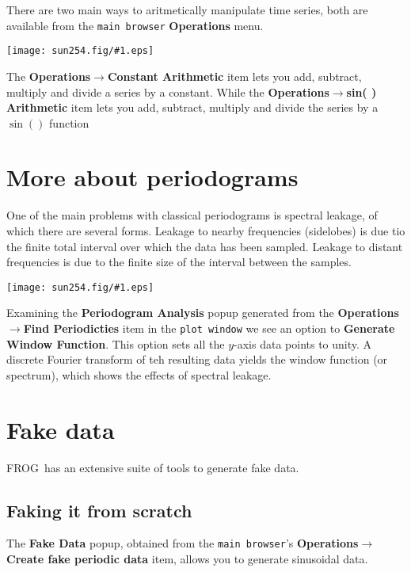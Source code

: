 \documentclass[twoside,11pt]{article}
\newcommand{\htmladdimg}[1]{}
\newcommand{\latexhtml}[2]{#1}
\newcommand{\xlabel}[1]{}
\renewcommand{\_}{\texttt{\symbol{95}}}
\newcommand{\FROG}{\textsf{FROG}}
\newcommand{\mainfigure}[1]
{\begin{center}
 \latexhtml{\texttt{[image: sun254.fig/\#1.eps]}}{\htmladdimg{../sun254.fig/#1.gif}}
 \end{center}
}
\newcommand{\menuitem}[1]{\textbf{#1}}
\newcommand{\submenuitem}[2]{\latexhtml{\textbf{#1$\rightarrow$#2}}{\textbf{#1=>#2}}}
\newcommand{\labelitem}[1]{\textbf{#1}}
\newcommand{\hitext}[1]{\texttt{#1}}
\begin{document}
There are two main ways to aritmetically manipulate time series, both are available from the \hitext{main browser} \menuitem{Operations} menu.

\mainfigure{arith_functions}

The \submenuitem{Operations}{Constant Arithmetic} item lets you add, subtract, multiply and divide a series by a constant. While the \submenuitem{Operations}{sin( ) Arithmetic} item lets you add, subtract, multiply and divide the series by a $\sin()$ function

\section{More about periodograms\xlabel{more_periodograms}}

One of the main problems with classical periodograms is spectral leakage, of which there are several forms. Leakage to nearby frequencies (sidelobes) is due tio the finite total interval over which the data has been sampled. Leakage to distant frequencies is due to the finite size of the interval between the samples.

\mainfigure{periodogram_popup}

Examining the \labelitem{Periodogram Analysis} popup generated from the \submenuitem{Operations}{Find Periodicties} item in the \hitext{plot window} we see an option to \labelitem{Generate Window Function}. This option sets all the $y$-axis data points to unity. A discrete Fourier transform of teh resulting data yields the window function (or spectrum), which shows the effects of spectral leakage.

\section{Fake data\xlabel{fake_data}}

\FROG\ has an extensive suite of tools to generate fake data.

\subsection{Faking it from scratch\xlabel{fake_from_scratch}}

The \labelitem{Fake Data} popup, obtained from the \hitext{main browser}'s \submenuitem{Operations}{Create fake periodic data} item, allows you to generate sinusoidal data.
\end{document}
